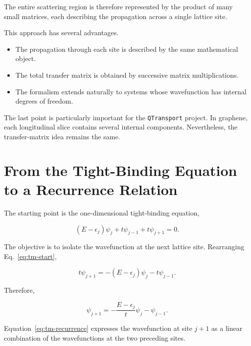 The entire scattering region is therefore represented by the product of
many small matrices, each describing the propagation across a single
lattice site.

This approach has several advantages.

\begin{itemize}
	\item The propagation through each site is described by the same
	      mathematical object.

	\item The total transfer matrix is obtained by successive matrix
	      multiplications.

	\item The formalism extends naturally to systems whose wavefunction
	      has internal degrees of freedom.
\end{itemize}

The last point is particularly important for the \texttt{QTransport}
project. In graphene, each longitudinal slice contains several internal
components. Nevertheless, the transfer-matrix idea remains the same.


\section{From the Tight-Binding Equation to a Recurrence Relation}

The starting point is the one-dimensional tight-binding equation,

\begin{equation}
	(E-\epsilon_j)\psi_j
	+
	t\psi_{j-1}
	+
	t\psi_{j+1}
	=
	0.
	\label{eq:tm-start}
\end{equation}

The objective is to isolate the wavefunction at the next lattice site.
Rearranging Eq.~\eqref{eq:tm-start},

\begin{equation}
	t\psi_{j+1}
	=
	-
	(E-\epsilon_j)\psi_j
	-
	t\psi_{j-1}.
\end{equation}

Therefore,

\begin{equation}
	\psi_{j+1}
	=
	-
	\frac{E-\epsilon_j}{t}
	\psi_j
	-
	\psi_{j-1}.
	\label{eq:tm-recurrence}
\end{equation}

Equation~\eqref{eq:tm-recurrence} expresses the wavefunction at site
$j+1$ as a linear combination of the wavefunctions at the two preceding
sites.

